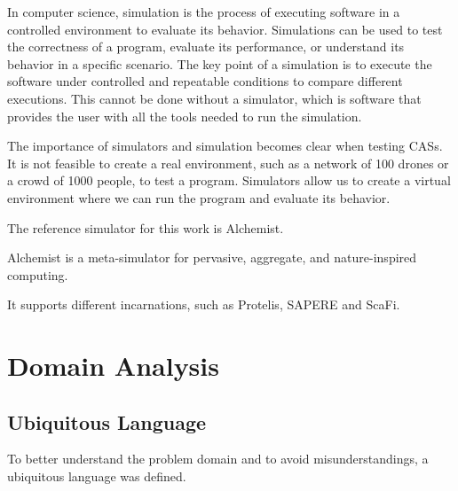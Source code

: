 \documentclass[12pt,a4paper,openright,twoside]{book}
\begin{document}
In computer science, simulation is the process of executing software in a controlled environment to evaluate its behavior. 
Simulations can be used to test the correctness of a program, evaluate its performance, or understand its behavior in a specific scenario. 
The key point of a simulation is to execute the software under controlled and repeatable conditions to compare different executions. 
This cannot be done without a simulator, which is software that provides the user with all the tools needed to run the simulation. \cite{argun2021simulation, bagrodia1998parsec}

The importance of simulators and simulation becomes clear when testing CASs. 
It is not feasible to create a real environment, such as a network of 100 drones or a crowd of 1000 people, to test a program. 
Simulators allow us to create a virtual environment where we can run the program and evaluate its behavior.

The reference simulator for this work is Alchemist. \cite{Pianini_2013}

Alchemist is a meta-simulator for pervasive, aggregate, and nature-inspired computing. 

It supports different incarnations, such as Protelis, SAPERE and ScaFi. \cite{DBLP:conf/sac/PianiniVB15, DBLP:conf/saso/CastelliMRZ11, DBLP:journals/softx/CasadeiVAP22}


\chapter{Domain Analysis}

\section{Ubiquitous Language}

To better understand the problem domain and to avoid misunderstandings, a ubiquitous language was defined.
\end{document}
